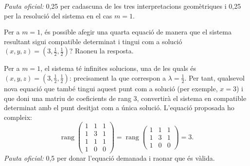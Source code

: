 \begin{apartats}
\begin{solucio}
\textit{Pauta oficial:} 0,25 per cadascuna de les tres interpretacions geomètriques i 0,25
per la resolució del sistema en el cas $m=1$.
\end{solucio}

Per a $m=1$, és possible afegir una quarta equació de manera que el sistema resultant sigui
compatible determinat i tingui com a solució $(x,y,z)=\left(3,\frac12,\frac12\right)$?
Raoneu la resposta.

\begin{solucio}
Per a $m=1$, el sistema té infinites solucions, una de les quals és
$(x,y,z)=\left(3,\frac12,\frac12\right)$: precisament la que correspon a $\lambda=\frac12$.
Per tant, qualsevol nova equació que també tingui aquest punt com a solució (per exemple,
$x=3$) i que doni una matriu de coeficients de rang 3, convertirà el sistema en compatible
determinat amb el punt desitjat com a única solució. L'equació proposada ho compleix:
\[
\operatorname{rang}\begin{pmatrix}1&1&1\\1&3&1\\1&1&1\\1&0&0\end{pmatrix}
=\operatorname{rang}\begin{pmatrix}1&1&1\\1&3&1\\1&0&0\end{pmatrix}=3.
\]
\textit{Pauta oficial:} 0,5 per donar l'equació demanada i raonar que és vàlida.
\end{solucio}

\end{apartats}
